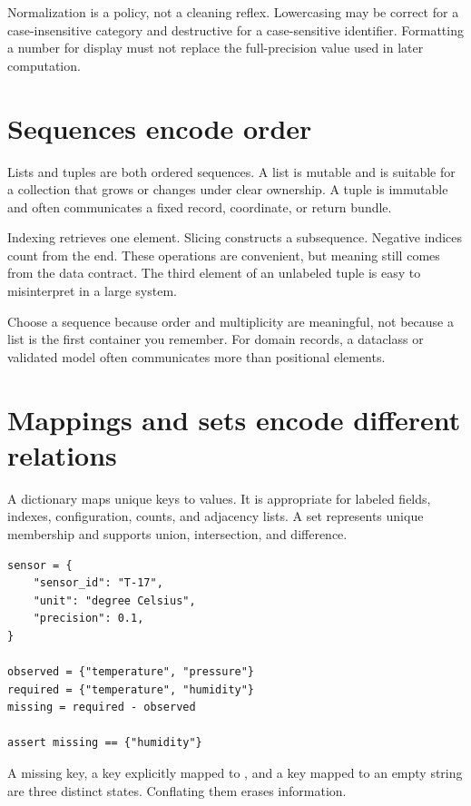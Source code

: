 Normalization is a policy, not a cleaning reflex. Lowercasing may be correct for
a case-insensitive category and destructive for a case-sensitive identifier.
Formatting a number for display must not replace the full-precision value used
in later computation.

\section{Sequences encode order}

Lists and tuples are both ordered sequences. A list is mutable and is suitable
for a collection that grows or changes under clear ownership. A tuple is
immutable and often communicates a fixed record, coordinate, or return bundle.

Indexing retrieves one element. Slicing constructs a subsequence. Negative
indices count from the end. These operations are convenient, but meaning still
comes from the data contract. The third element of an unlabeled tuple is easy to
misinterpret in a large system.

\begin{professionalbox}
Choose a sequence because order and multiplicity are meaningful, not because a
list is the first container you remember. For domain records, a dataclass or
validated model often communicates more than positional elements.
\end{professionalbox}

\section{Mappings and sets encode different relations}

A dictionary maps unique keys to values. It is appropriate for labeled fields,
indexes, configuration, counts, and adjacency lists. A set represents unique
membership and supports union, intersection, and difference.

\begin{lstlisting}
sensor = {
    "sensor_id": "T-17",
    "unit": "degree Celsius",
    "precision": 0.1,
}

observed = {"temperature", "pressure"}
required = {"temperature", "humidity"}
missing = required - observed

assert missing == {"humidity"}
\end{lstlisting}

A missing key, a key explicitly mapped to , and a key mapped to an
empty string are three distinct states. Conflating them erases information.

